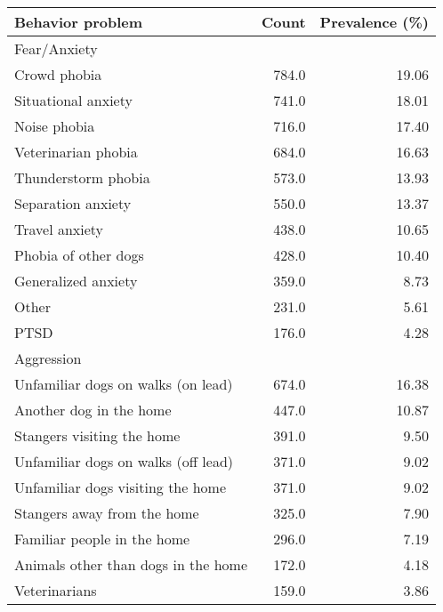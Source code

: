 \documentclass[varwidth=\maxdimen]{standalone}
\newcommand{\subrow}[1]{\hspace{1.25em}#1}
\begin{document}
\begin{tabular}[t]{lrr}
\toprule
Behavior problem &  Count &  Prevalence (\%) \\
\midrule
Fear/Anxiety \\
  \subrow{Crowd phobia}                        &      784.0 &           19.06 \\
  \subrow{Situational anxiety}                 &      741.0 &           18.01 \\
  \subrow{Noise phobia}                        &      716.0 &           17.40 \\
  \subrow{Veterinarian phobia}                 &      684.0 &           16.63 \\
  \subrow{Thunderstorm phobia}                 &      573.0 &           13.93 \\
  \subrow{Separation anxiety}                  &      550.0 &           13.37 \\
  \subrow{Travel anxiety}                      &      438.0 &           10.65 \\
  \subrow{Phobia of other dogs}                &      428.0 &           10.40 \\
  \subrow{Generalized anxiety}                 &      359.0 &            8.73 \\
  \subrow{Other}                               &      231.0 &            5.61 \\
  \subrow{PTSD}                                &      176.0 &            4.28 \\
Aggression \\
  \subrow{Unfamiliar dogs on walks (on lead)}  &      674.0 &           16.38 \\
  \subrow{Another dog in the home}             &      447.0 &           10.87 \\
  \subrow{Stangers visiting the home}          &      391.0 &            9.50 \\
  \subrow{Unfamiliar dogs on walks (off lead)} &      371.0 &            9.02 \\
  \subrow{Unfamiliar dogs visiting the home}   &      371.0 &            9.02 \\
  \subrow{Stangers away from the home}         &      325.0 &            7.90 \\
  \subrow{Familiar people in the home}         &      296.0 &            7.19 \\
  \subrow{Animals other than dogs in the home} &      172.0 &            4.18 \\
  \subrow{Veterinarians}                       &      159.0 &            3.86 \\

\end{tabular}
\end{document}
